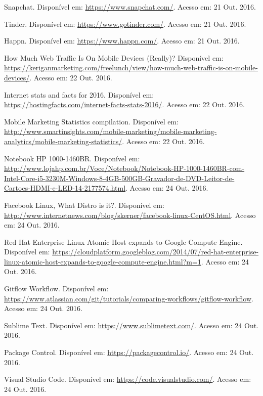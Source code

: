 \documentclass[brazil,ruledheader]{abntifes}
\begin{document}
\begin{thebibliography}{9}
		Snapchat. Disponível em: \url{https://www.snapchat.com/}.
		Acesso em: 21 Out. 2016.
		
		Tinder. Disponível em: \url{https://www.gotinder.com/}.
		Acesso em: 21 Out. 2016.
		
		Happn. Disponível em: \url{https://www.happn.com/}.
		Acesso em: 21 Out. 2016.
		
		How Much Web Traffic Is On Mobile Devices (Really)? Disponível em: \url{https://keriganmarketing.com/freelunch/view/how-much-web-traffic-is-on-mobile-devices/}.
		Acesso em: 22 Out. 2016.
		
		Internet stats and facts for 2016. Disponível em: \url{https://hostingfacts.com/internet-facts-stats-2016/}.
		Acesso em: 22 Out. 2016.
		
		Mobile Marketing Statistics compilation. Disponível em: \url{http://www.smartinsights.com/mobile-marketing/mobile-marketing-analytics/mobile-marketing-statistics/}.
		Acesso em: 22 Out. 2016.
		
		Notebook HP 1000-1460BR. Disponível em: \url{http://www.lojahp.com.br/Voce/Notebook/Notebook-HP-1000-1460BR-com-Intel-Core-i5-3230M-Windows-8-4GB-500GB-Gravador-de-DVD-Leitor-de-Cartoes-HDMI-e-LED-14-2177574.html}.
		Acesso em: 24 Out. 2016.
		
		Facebook Linux, What Distro is it?. Disponível em: \url{http://www.internetnews.com/blog/skerner/facebook-linux-CentOS.html}.
		Acesso em: 24 Out. 2016.
		
		Red Hat Enterprise Linux Atomic Host expands to Google Compute Engine. Disponível em: \url{https://cloudplatform.googleblog.com/2014/07/red-hat-enterprise-linux-atomic-host-expands-to-google-compute-engine.html?m=1}.
		Acesso em: 24 Out. 2016.
		
		Gitflow Workflow. Disponível em: \url{https://www.atlassian.com/git/tutorials/comparing-workflows/gitflow-workflow}.
		Acesso em: 24 Out. 2016.
		
		Sublime Text. Disponível em: \url{https://www.sublimetext.com/}.
		Acesso em: 24 Out. 2016.
		
		Package Control. Disponível em: \url{https://packagecontrol.io/}.
		Acesso em: 24 Out. 2016.
		
		Visual Studio Code. Disponível em: \url{https://code.visualstudio.com/}.
		Acesso em: 24 Out. 2016.
		

\end{thebibliography}
\end{document}

